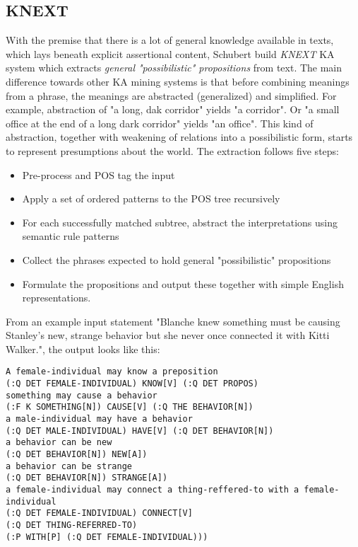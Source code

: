 \subsection{KNEXT}
\label{section:r:knext}
With the premise that there is a lot of general knowledge available in texts,
which lays beneath explicit assertional content, Schubert build \emph{KNEXT} KA
system\parencite{Schubert2002} which extracts \emph{general "possibilistic"
propositions} from text. The main difference towards other KA mining systems is
that before combining meanings from a phrase, the meanings are abstracted
(generalized) and simplified. For example, abstraction of "a long, dak corridor"
yields "a corridor". Or "a small office at the end of a long dark corridor" 
yields "an office". This kind of abstraction, together with weakening of 
relations into a possibilistic form, starts to represent presumptions about the
world. 
The extraction follows five steps:
\begin{itemize}
    \item Pre-process and POS tag the input
    \item Apply a set of ordered patterns to the POS tree recursively
    \item For each successfully matched subtree, abstract the interpretations
          using semantic rule patterns
    \item Collect the phrases expected to hold general "possibilistic" 
        propositions
    \item Formulate the propositions and output these together with simple
        English representations.
\end{itemize}
From an example input statement "Blanche knew something must be causing 
Stanley's new, strange behavior but she never once connected it with Kitti 
Walker.", the output looks like this:

\lstset{breaklines=true}
\begin{lstlisting}
A female-individual may know a preposition 
(:Q DET FEMALE-INDIVIDUAL) KNOW[V] (:Q DET PROPOS) 
something may cause a behavior
(:F K SOMETHING[N]) CAUSE[V] (:Q THE BEHAVIOR[N])
a male-individual may have a behavior
(:Q DET MALE-INDIVIDUAL) HAVE[V] (:Q DET BEHAVIOR[N])
a behavior can be new
(:Q DET BEHAVIOR[N]) NEW[A])
a behavior can be strange
(:Q DET BEHAVIOR[N]) STRANGE[A])
a female-individual may connect a thing-reffered-to with a female-individual
(:Q DET FEMALE-INDIVIDUAL) CONNECT[V] 
(:Q DET THING-REFERRED-TO) 
(:P WITH[P] (:Q DET FEMALE-INDIVIDUAL)))
\end{lstlisting}


